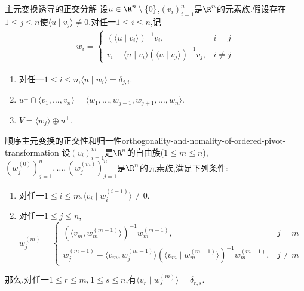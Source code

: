 \begin{theorem}{主元变换诱导的正交分解}{}
	设$u\in\R^{n}\setminus\left\{0\right\}$,$\left(v_{i}\right)_{i=1}^{n}$是$\R^{n}$的元素族.假设存在$1\leq j\leq n$使$\langle u\mid v_{j}\rangle\neq 0$.对任一$1\leq i\leq n$,记
	\begin{align*}
		w_{i}=
		\begin{cases}
			\left(\langle u\mid v_{i}\rangle\right)^{-1}v_{i},&i=j\\
			v_{i}-\langle u\mid v_{i}\rangle\left(\langle u\mid v_{j}\rangle\right)^{-1}v_{j},&i\neq j
		\end{cases}
	\end{align*}
	\begin{enumerate}
		\item 对任一$1\leq i\leq n$,$\langle u\mid w_{i}\rangle=\delta_{j,i}$.
		\item $u^{\perp}\cap\langle v_{1},\ldots,v_{n}\rangle=\langle w_{1},\ldots,w_{j-1},w_{j+1},\ldots,w_{n}\rangle$.
		\item $V=\langle w_{j}\rangle\oplus u^{\perp}$.
	\end{enumerate}
\end{theorem}

\begin{lemma}{顺序主元变换的正交性和归一性}{orthogonality-and-nomality-of-ordered-pivot-transformation}
	设$\left(v_{i}\right)_{i=1}^{m}$是$\R^{n}$的自由族($1\leq m\leq n$),$\left(w_{j}^{\left(0\right)}\right)_{j=1}^{n},\ldots,\left(w_{j}^{\left(m\right)}\right)_{j=1}^{n}$是$\R^{n}$的元素族,满足下列条件:
	\begin{enumerate}
		\item 对任一$1\leq i\leq m$,$\langle v_{i}\mid w_{i}^{\left(i-1\right)}\rangle\neq 0$.
		\item 对任一$1\leq j\leq n$,$w_{j}^{\left(m\right)}=
		\begin{cases}
			\left(\langle v_{m},w_{m}^{\left(m-1\right)}\rangle\right)^{-1}w_{m}^{\left(m-1\right)},&j=m\\
			w_{j}^{\left(m-1\right)}-\langle v_{m},w_{j}^{\left(m-1\right)}\rangle\left(\langle v_{m}\mid w_{m}^{\left(m-1\right)}\rangle\right)^{-1}w_{m}^{\left(m-1\right)},&j\neq m
		\end{cases}$
	\end{enumerate}
	那么,对任一$1\leq r\leq m,1\leq s\leq n$,有$\langle v_{r}\mid w_{s}^{\left(m\right)}\rangle=\delta_{r,s}$.
\end{lemma}

